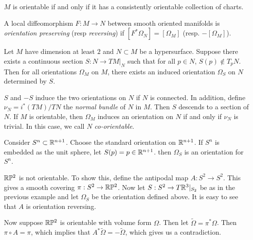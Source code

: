 \documentclass[twoside, 10pt]{article}
\begin{document}
    \begin{exer}
        $M$ is orientable if and only if it has a consistently orientable collection of charts.
    \end{exer}

    \begin{defn}
        A local diffeomorphism $F:M \to N$ between smooth oriented manifolds is \textit{orientation preserving} (resp \textit{reversing}) if $[F^*\Omega_N] = [\Omega_M]$ (resp. $-[\Omega_M]$).
    \end{defn}

    \begin{prop}
        Let $M$ have dimension at least $2$ and $N \subset M$ be a hypersurface. Suppose there exists a continuous section $S: N \to TM|_N$ such that for all $p \in N$, $S(p) \notin T_pN$. Then for all orientations $\Omega_M$ on $M$, there exists an induced orientation $\Omega_S$ on $N$ determined by $S$.
    \end{prop}

    \begin{rmk}
        $S$ and $-S$ induce the two orientations on $N$ if $N$ is connected. In addition, define $\nu_N = i^*(TM) / TN$ the \textit{normal bundle} of $N$ in $M$. Then $S$ descends to a section of $N$. If $M$ is orientable, then $\Omega_M$ induces an orientation on $N$ if and only if $\nu_N$ is trivial. In this case, we call $N$ \textit{co-orientable}.
    \end{rmk}

    \begin{exm}
        Consider $S^n \subset \mathbb{R}^{n+1}$. Choose the standard orientation on $\mathbb{R}^{n+1}$. If $S^n$ is embedded as the unit sphere, let $S(p) = p \in \mathbb{R}^{n+1}$. then $\Omega_S$ is an orientation for $S^n$.
    \end{exm}

    \begin{exm}
        $\mathbb{R}\mathbb{P}^2$ is not orientable. To show this, define the antipodal map $A: S^2 \to S^2$. This gives a smooth covering $\pi: S^2 \to \mathbb{R}\mathbb{P}^2$. Now let $S: S^2 \to T\mathbb{R}^3|_{S_2}$ be as in the previous example and let $\Omega_S$ be the orientation defined above. It is easy to see that $A$ is orientation reversing. 

        Now suppose $\mathbb{R}\mathbb{P}^2$ is orientable with volume form $\Omega$. Then let $\widetilde{\Omega} = \pi^*\Omega$. Then $\pi \circ A = \pi$, which implies that $A^*\widetilde{\Omega} = - \widetilde{\Omega}$, which gives us a contradiction.
    \end{exm}
\end{document}
